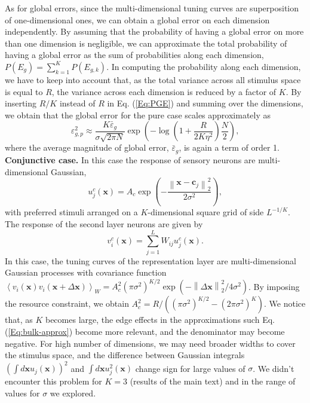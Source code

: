 \documentclass[a4paper]{article}%
\begin{document}
As for global errors, since the multi-dimensional tuning curves are
superposition of one-dimensional ones, we can obtain a global error on each
dimension independently. By assuming that the probability of having a global
error on more than one dimension is negligible, we can approximate the total
probability of having a global error as the sum of probabilities along each
dimension, $P(E_{g}) = \sum_{k=1}^{K} P(E_{g,k})$. In computing the
probability along each dimension, we have to keep into account that, as the
total variance across all stimulus space is equal to $R$, the variance across
each dimension is reduced by a factor of $K$. By inserting $R/K$ instead of
$R$ in Eq. (\ref{Eq:PGE}) and summing over the dimensions, we obtain that the
global error for the pure case scales approximately as
\begin{equation}
\varepsilon_{g,p}^{2} \approx\frac{K\bar{\varepsilon}_{g} }{\sigma\sqrt{2\pi
N}} \exp{\left(  -\log\left(  1 + \frac{R} {2 K \eta^{2}}\right)  \frac{N}{2}
\right)  }, \label{Eq:multi-global-pure}%
\end{equation}
where the average magnitude of global error, $\bar{\varepsilon}_{g}$, is again
a term of order 1. \newline\newline\textbf{Conjunctive case.} In this case the
response of sensory neurons are multi-dimensional Gaussian,
\begin{equation}
u^{c}_{j}\left(  \mathbf{x}\right)  =A_{c} \exp{\left(  -\frac{\left\|
\mathbf{x}-\mathbf{c}_{j}\right\|  _{2}^{2}} {2\sigma^{2}}\right)  },
\end{equation}
with preferred stimuli arranged on a $K$-dimensional square grid of side $L^{-1/K}$. The response of the second layer neurons are given by
\begin{equation}
v^{c}_{i}(\mathbf{x}) = \sum_{j=1}^L W_{ij} u_{j}^c(\mathbf{x}).
\end{equation}
In this case, the tuning curves of the representation layer are multi-dimensional Gaussian processes with
covariance function $\left\langle v_i(\mathbf{x})v_i(\mathbf{x} + \Delta
\mathbf{x}) \right\rangle _{W} = A_{c}^{2} \left(\pi\sigma^2\right)^{K/2} \exp{\left(  -\left\|
\Delta\mathbf{x}\right\|  _{2}^{2}/4\sigma^{2} \right)  }$. By imposing the
resource constraint, we obtain $A_{c}^{2} = R/\left(  \left(  \pi\sigma
^{2}\right)  ^{K/2} - (2\pi\sigma^{2})^{K} \right)  $. We notice that, as $K$
becomes large, the edge effects in the approximations such Eq.
(\ref{Eq:bulk-approx}) become more relevant, and the denominator may become
negative. For high number of dimensions, we may need broader widths to cover
the stimulus space, and the difference between Gaussian integrals $\left(
\int d\mathbf{x} u_{j}(\mathbf{x})\right)  ^{2}$ and $\int d\mathbf{x}
u_{j}^{2}(\mathbf{x})$ change sign for large values of $\sigma$. We didn't
encounter this problem for $K=3$ (results of the main text) and in the range
of values for $\sigma$ we explored.
\end{document}
